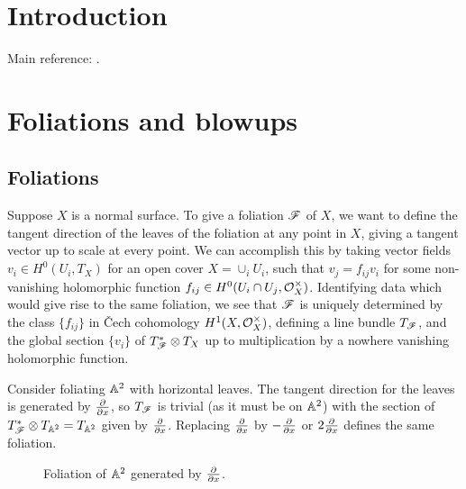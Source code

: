 
\section{Introduction}


Main reference: \cite{brunella_book}.

\section{Foliations and blowups}


\subsection{Foliations}

Suppose $X$ is a normal surface. To give a foliation $\mathscr{F}$ of $X$, we want to
define the tangent direction of the leaves of the foliation at any point in $X$,
giving a tangent vector up to scale at every point. We can accomplish this by
taking vector fields $v_i\in H^0(U_i,T_X)$ for an open cover $X=\cup_iU_i$, such
that $v_j=f_{ij}v_i$ for some non-vanishing holomorphic function
$f_{ij}\in H^0(U_i\cap U_j,\mathcal{O}_X^\times)$. Identifying data which would give rise
to the same foliation, we see that $\mathscr{F}$ is uniquely determined by the class
$\{f_{ij}\}$ in \v{C}ech cohomology $H^1(X,\mathcal{O}_X^\times)$, defining a line bundle
$T_{\mathscr{F}}$, and the global section $\{v_i\}$ of $T_{\mathscr{F}}^*\otimes T_X$ up to
multiplication by a nowhere vanishing holomorphic function.

\begin{example}
    Consider foliating $\mathbb{A}^2$ with horizontal leaves. The tangent direction for
    the leaves is generated by $\pdv{}{x}$, so $T_{\mathscr{F}}$ is trivial (as it must
    be on $\mathbb{A}^2$) with the section of $T_{\mathscr{F}}^*\otimes T_{\mathbb{A}^2}=T_{\mathbb{A}^2}$ given
    by $\pdv{}{x}$. Replacing $\pdv{}{x}$ by $-\pdv{}{x}$ or $2\pdv{}{x}$
    defines the same foliation.
    \begin{figure}[H]
        \centering
        \caption{Foliation of $\mathbb{A}^2$ generated by $\pdv{}{x}$.}
    \end{figure}
\end{example}

